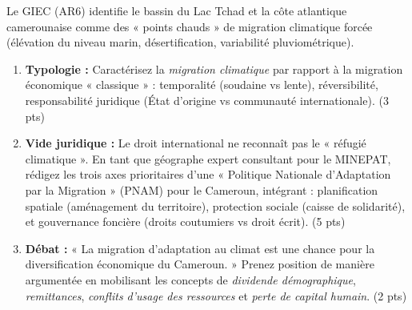 \documentclass[11pt]{article}
\begin{document}
\begin{exercice}
\label{exo:prospective}
Le GIEC (AR6) identifie le bassin du Lac Tchad et la côte atlantique camerounaise comme des « points chauds » de migration climatique forcée (élévation du niveau marin, désertification, variabilité pluviométrique).

\begin{enumerate}
    \item \textbf{Typologie :} Caractérisez la \textit{migration climatique} par rapport à la migration économique « classique » : temporalité (soudaine vs lente), réversibilité, responsabilité juridique (État d'origine vs communauté internationale). (3 pts)
    \item \textbf{Vide juridique :} Le droit international ne reconnaît pas le « réfugié climatique ». En tant que géographe expert consultant pour le MINEPAT, rédigez les trois axes prioritaires d'une « Politique Nationale d'Adaptation par la Migration » (PNAM) pour le Cameroun, intégrant : planification spatiale (aménagement du territoire), protection sociale (caisse de solidarité), et gouvernance foncière (droits coutumiers vs droit écrit). (5 pts)
    \item \textbf{Débat :} « La migration d'adaptation au climat est une chance pour la diversification économique du Cameroun. » Prenez position de manière argumentée en mobilisant les concepts de \textit{dividende démographique}, \textit{remittances}, \textit{conflits d'usage des ressources} et \textit{perte de capital humain}. (2 pts)
\end{enumerate}
\end{exercice}
\end{document}
